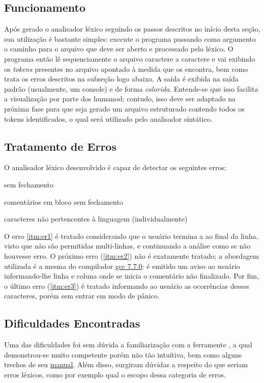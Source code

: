 \documentclass[
	article,			%
	11pt,				%
	oneside,			%
	a4paper,			%
	english,			%
	brazil,				%
	sumario=tradicional
	]{abntex2}
\begin{document}
\subsection{Funcionamento}
Após gerado o analisador léxico seguindo os passos descritos no início desta seção, sua utilização é bastante simples: execute o programa passando como argumento o caminho para o arquivo que deve ser aberto e processado pelo léxico. O programa então lê sequenciamente o arquivo caractere a caractere e vai exibindo os \textit{tokens} presentes no arquivo apontado à medida que os encontra, bem como trata os erros descritos na subseção logo abaixo.
A saída é exibida na saída padrão (usualmente, um console) e de forma \textit{colorida}. Entende-se que isso facilita a visualização por parte dos humanod; contudo, isso deve ser adaptado na próxima fase para que seja gerado um arquivo estruturado contendo todos os tokens identificados, o qual será utilizado pelo analisador sintático.

\subsection{Tratamento de Erros}
O analisador léxico desenvolvido é capaz de detectar os seguintes erros:
\begin{enumerate}{
	\item \label{itm:er1} sem fechamento
	\item \label{itm:er2}comentários em bloco sem fechamento
	\item \label{itm:er3}caracteres não pertencentes à linguagem (individualmente)
}\end{enumerate}
O erro \ref{itm:er1} é tratado considerando que o usuário termina a  ao final da linha, visto que não são permitidas  multi-linhas, e continuando a análise como se não houvesse erro.
O próximo erro (\ref{itm:er2}) não é exatamente tratado; a abordagem utilizada é a mesma do compilador \href{https://gcc.gnu.org/}{gcc 7.7.0}: é emitido um aviso ao usuário informando-lhe linha e coluna onde se inicia o comentário não finalizado.
Por fim, o último erro (\ref{itm:er3}) é tratado informando ao usuário as ocorrências desses caracteres, porém sem entrar em modo de pânico.

\subsection {Dificuldades Encontradas}
Uma das dificuldades foi sem dúvida a familiarização com a ferramente , a qual demonstrou-se muito competente porém não tão intuitiva, bem como alguns trechos de seu \href{ftp://ftp.gnu.org/old-gnu/Manuals/flex-2.5.4/html_mono/flex.html}{manual}. Além disso, surgiram dúvidas a respeito do que seriam erros léxicos, como por exemplo qual o escopo dessa categoria de erros.
\end{document}

